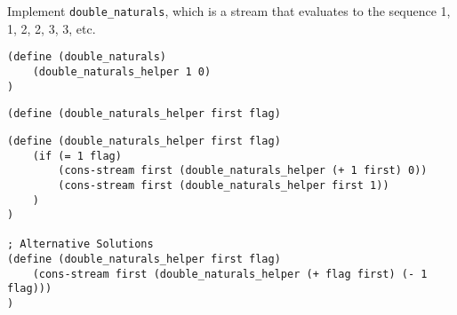 \begin{blocksection}
\question Implement \lstinline$double_naturals$, which is a stream that evaluates to the sequence 1, 1, 2, 2, 3, 3, etc.

\begin{lstlisting}
(define (double_naturals)
    (double_naturals_helper 1 0)
)
\end{lstlisting}

\ifprintanswers\else
\begin{lstlisting}
(define (double_naturals_helper first flag)
\end{lstlisting}
\fi

\begin{solution}[1in]
\begin{lstlisting}
(define (double_naturals_helper first flag)
    (if (= 1 flag)
        (cons-stream first (double_naturals_helper (+ 1 first) 0))
        (cons-stream first (double_naturals_helper first 1))
    )
)

; Alternative Solutions
(define (double_naturals_helper first flag)
    (cons-stream first (double_naturals_helper (+ flag first) (- 1 flag)))
)
\end{lstlisting}
\end{solution}
\end{blocksection}
